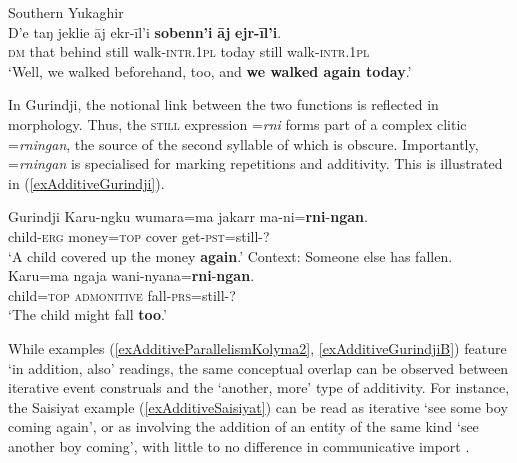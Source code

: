 \begin{exe}
	\ex Southern Yukaghir\label{exAdditiveKolyma3}\\
	\gll D\rq{}e taŋ jeklie āj ekr-īl\rq{}i \textbf{sobenn\rq{}i} \textbf{āj} \textbf{ejr-īl\rq{}i}.\\
	\textsc{dm} that behind still walk-\textsc{intr}.1\textsc{pl} today still walk-\textsc{intr}.1\textsc{pl}\\
	\glt \lq Well, we walked beforehand, too, and \textbf{we walked again today}.\rq{}
	\\\parencite[529]{Maslova2003}
\end{exe}

In Gurindji, the notional link between the two functions is reflected in morphology. Thus, the \textsc{still} expression \mbox{=\textit{rni}} forms part of a complex clitic \mbox{=\textit{rningan}}, the source of the second syllable of which is obscure. Importantly, \mbox{=\textit{rningan}} is specialised for marking repetitions and additivity. This is illustrated in (\ref{exAdditiveGurindji}).

\begin{exe}
	\ex \label{exAdditiveGurindji}
	\begin{xlist}
		\exi{}Gurindji
		\ex
		\gll Karu-ngku wumara=ma jakarr ma-ni=\textbf{rni}-\textbf{ngan}.\\
	child-\textsc{erg} money=\textsc{top} cover get-\textsc{pst}=still-?\\
	\glt \lq A child covered up the money \textbf{again}.\rq{}
	\ex Context: Someone else has fallen.\label{exAdditiveGurindjiB}\\
	\gll Karu=ma ngaja wani-nyana=\textbf{rni}-\textbf{ngan}.\\
	child=\textsc{top} \textsc{admonitive} fall-\textsc{prs}=still-?\\
	\glt \lq The child might fall \textbf{too}.' \parencite[6, 9]{McConvell1983}
	\end{xlist}
\end{exe}


While examples (\ref{exAdditiveParallelismKolyma2}, \ref{exAdditiveGurindjiB}) feature \lq in addition, also\rq{ }readings, the same conceptual overlap can be observed between iterative event construals and the \lq another, more\rq{ }type of additivity. For instance, the Saisiyat example (\ref{exAdditiveSaisiyat}) can be read as iterative \lq see some boy coming again\rq{}, or as involving the addition of an entity of the same kind \lq see another boy coming\rq{}, with little to no difference in communicative import \parencite[108–109]{Huang2008}.

